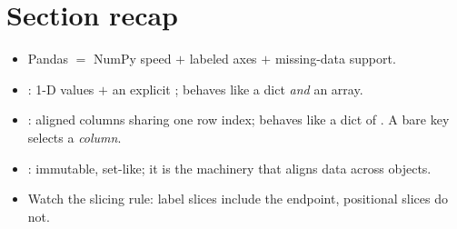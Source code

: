 \documentclass[11pt]{article}
\begin{document}
\section*{Section recap}
\begin{itemize}
  \item Pandas $=$ NumPy speed $+$ labeled axes $+$ missing-data support.
  \item {}: 1-D values $+$ an explicit ; behaves like a dict \emph{and} an array.
  \item {}: aligned columns sharing one row index; behaves like a dict of . A bare key selects a \emph{column}.
  \item {}: immutable, set-like; it is the machinery that aligns data across objects.
  \item Watch the slicing rule: label slices include the endpoint, positional slices do not.
\end{itemize}
\end{document}
